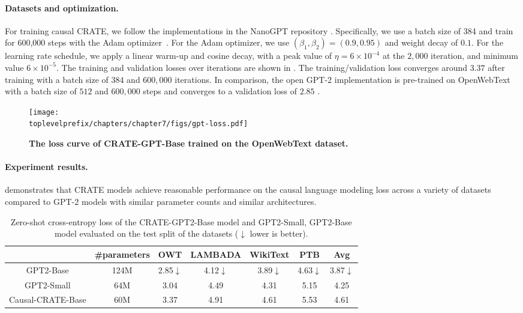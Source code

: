 \documentclass[../../book-main.tex]{subfiles}
\begin{document}
\paragraph{Datasets and optimization.} For training causal CRATE, we follow the implementations in the NanoGPT repository \citep{nanogpt}. Specifically, we use a batch size of 384 and train for 600,000 steps with the Adam optimizer~\citep{kingma2014adam}. For the Adam optimizer, we use $(\beta_1, \beta_2)=(0.9, 0.95)$ and weight decay of $0.1$. For the learning rate schedule, we apply a linear warm-up and cosine decay, with a peak value of $\eta=6\times 10^{-4}$ at the $2,000$ iteration, and minimum value $6\times 10^{-5}$. The training and validation losses over iterations are shown in . The training/validation loss converges around $3.37$ after training with a batch size of $384$ and $600,000$ iterations. In comparison, the open GPT-2 implementation is pre-trained on OpenWebText with a batch size of $512$ and $600,000$ steps and converges to a validation loss of $2.85$ \citep{nanogpt}.  

\begin{figure}
    \centering
    \texttt{[image: \\toplevelprefix/chapters/chapter7/figs/gpt-loss.pdf]}
    \caption{\bf The loss curve of CRATE-GPT-Base trained on the OpenWebText dataset.}
    \label{fig:crate-text-evals}
\end{figure}

\paragraph{Experiment results.}

 demonstrates that CRATE models achieve reasonable performance on the causal language modeling loss across a variety of datasets compared to GPT-2 models with similar parameter counts and similar architectures.


\begin{table}
\def\arraystretch{1.1}
    \small
    \caption{\small Zero-shot cross-entropy loss of the CRATE-GPT2-Base model and GPT2-Small, GPT2-Base model evaluated on the test split of the datasets ($\downarrow$ lower is better). 
    }
    \centering
    \begin{tabular}{ccccccc}
    \hline
    & \#parameters & \textbf{OWT} & \textbf{LAMBADA} & \textbf{WikiText} & \textbf{PTB} & \textbf{Avg} \\
     \hline
     GPT2-Base  & {124M} & 2.85$\downarrow$ & 4.12$\downarrow$ & 3.89$\downarrow$ & 4.63$\downarrow$ & 3.87$\downarrow$ \\
     {GPT2-Small } &  {64M} & {3.04} & {4.49} & {4.31} & {5.15} & {4.25} \\
     Causal-CRATE-Base & {60M} & 3.37 & 4.91 & 4.61 & 5.53 & 4.61 \\
     \hline
    \end{tabular}
    \label{tab:gpt-eval}
\end{table} 
\end{document}
